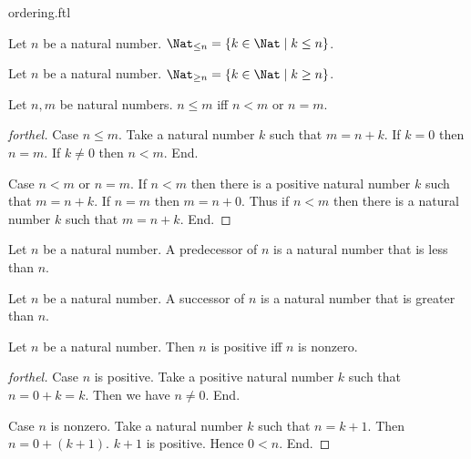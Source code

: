 \documentclass{naproche-library}
\begin{document}
\begin{smodule}{ordering.ftl}
  \begin{definition}[forthel,id=ARITHMETIC_04_72501526790144,printid]
    Let $n$ be a natural number.
    $\Nat_{\leq n} = \{ k \in \Nat \mid k \leq n \}$.
  \end{definition}

  \begin{definition}[forthel,id=ARITHMETIC_04_1706933421604864,printid]
    Let $n$ be a natural number.
    $\Nat_{\geq n} = \{ k \in \Nat \mid k \geq n \}$.
  \end{definition}

  \begin{proposition}[forthel,id=ARITHMETIC_04_5385415374667776,printid]
    Let $n, m$ be natural numbers.
    $n \leq m$ iff $n < m$ or $n = m$.
  \end{proposition}
  \begin{proof}[forthel]
    Case $n \leq m$.
      Take a natural number $k$ such that $m = n + k$.
      If $k = 0$ then $n = m$. If $k \neq 0$ then $n < m$.
    End.

    Case $n < m$ or $n = m$.
      If $n < m$ then there is a positive natural number $k$ such that $m = n + k$.
      If $n = m$ then $m = n + 0$.
      Thus if $n < m$ then there is a natural number $k$ such that $m = n + k$.
    End.
  \end{proof}

  \begin{definition}[forthel,id=ARITHMETIC_04_6232154608500736,printid]
    Let $n$ be a natural number.
    A predecessor of $n$ is a natural number that is less than $n$.
  \end{definition}

  \begin{definition}[forthel,id=ARITHMETIC_04_8147686326796288,printid]
    Let $n$ be a natural number.
    A successor of $n$ is a natural number that is greater than $n$.
  \end{definition}

  \begin{proposition}[forthel,id=ARITHMETIC_04_4826285599621120,printid]
    Let $n$ be a natural number.
    Then $n$ is positive iff $n$ is nonzero.
  \end{proposition}
  \begin{proof}[forthel]
    Case $n$ is positive.
      Take a positive natural number $k$ such that $n = 0 + k = k$.
      Then we have $n \neq 0$.
    End.

    Case $n$ is nonzero.
      Take a natural number $k$ such that $n = k + 1$.
      Then $n = 0 + (k + 1)$.
      $k + 1$ is positive.
      Hence $0 < n$.
    End.
  \end{proof}



\end{smodule}
\end{document}
